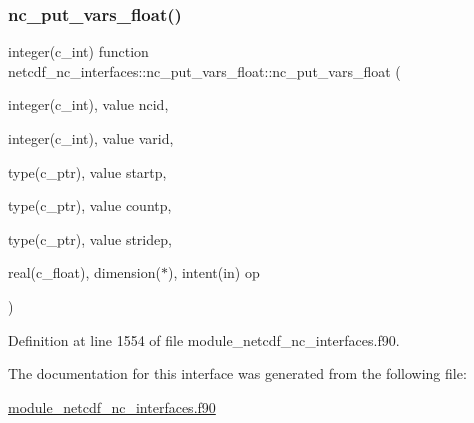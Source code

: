 \subsubsection{\texorpdfstring{nc\+\_\+put\+\_\+vars\+\_\+float()}{nc\_put\_vars\_float()}}
{\footnotesize\ttfamily integer(c\+\_\+int) function netcdf\+\_\+nc\+\_\+interfaces\+::nc\+\_\+put\+\_\+vars\+\_\+float\+::nc\+\_\+put\+\_\+vars\+\_\+float (\begin{DoxyParamCaption}\item[{integer(c\+\_\+int), value}]{ncid,  }\item[{integer(c\+\_\+int), value}]{varid,  }\item[{type(c\+\_\+ptr), value}]{startp,  }\item[{type(c\+\_\+ptr), value}]{countp,  }\item[{type(c\+\_\+ptr), value}]{stridep,  }\item[{real(c\+\_\+float), dimension($\ast$), intent(in)}]{op }\end{DoxyParamCaption})}



Definition at line 1554 of file module\+\_\+netcdf\+\_\+nc\+\_\+interfaces.\+f90.



The documentation for this interface was generated from the following file\+:\begin{DoxyCompactItemize}
\item 
\hyperlink{module__netcdf__nc__interfaces_8f90}{module\+\_\+netcdf\+\_\+nc\+\_\+interfaces.\+f90}\end{DoxyCompactItemize}

